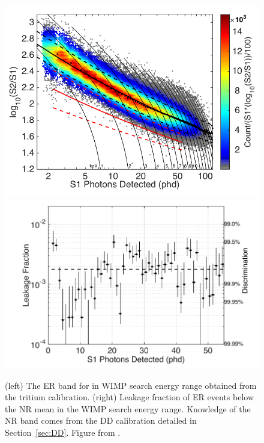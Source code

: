 \begin{figure}[htbp]
\begin{center}
\includegraphics[width=\halffig]{figures/lux/lux_tritium2a.png}
\includegraphics[width=\halffig]{figures/lux/lux_tritium2b.png}
\caption{ (left) The \acs{ER} band for in \acs{WIMP} search energy range obtained from the tritium calibration. (right) Leakage fraction of \acs{ER} events below the \acs{NR} mean in the \acs{WIMP} search energy range. Knowledge of the \acs{NR} band comes from the \acs{DD} calibration detailed in Section~\ref{sec:DD}. Figure from \cite{LUXTritium}.}
\label{fig:tritium2}
\end{center}
\end{figure}

